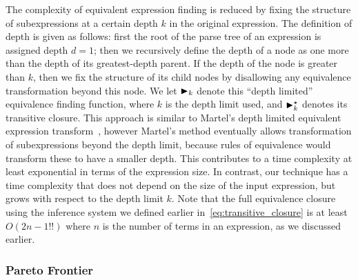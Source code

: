 The complexity of equivalent expression finding is reduced by fixing the
structure of subexpressions at a certain depth $k$ in the original expression.
The definition of depth is given as follows: first the root of the parse
tree of an expression is assigned depth $d = 1$; then we recursively define
the depth of a node as one more than the depth of its greatest-depth parent.
If the depth of the node is greater than $k$, then we fix the structure of
its child nodes by disallowing any equivalence transformation beyond this
node. We let $\operatorname{\blacktriangleright}_k$ denote this ``depth limited'' equivalence finding
function, where $k$ is the depth limit used, and $\operatorname{\blacktriangleright}^\star_k$ denotes
its transitive closure. This approach is similar to Martel's depth limited
equivalent expression transform~\cite{martel07}, however Martel's method
eventually allows transformation of subexpressions beyond the depth limit,
because rules of equivalence would transform these to have a smaller depth.
This contributes to a time complexity at least exponential in terms of the
expression size. In contrast, our technique has a time complexity that does not
depend on the size of the input expression, but grows with respect to the depth
limit $k$. Note that the full equivalence closure using the inference system we
defined earlier in~\eqref{eq:transitive_closure} is at least $O({2n - 1}!!)$
where $n$ is the number of terms in an expression, as we discussed earlier.

\subsubsection{Pareto Frontier}

